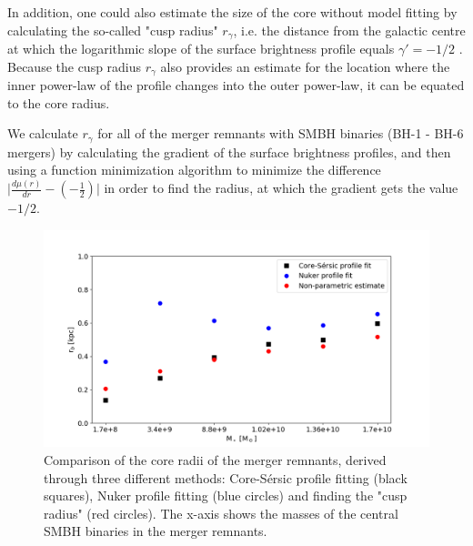 \documentclass[english, oneside]{HYgradu}
\begin{document}
In addition, one could also estimate the size of the core without model fitting by calculating the so-called "cusp radius" $r_\gamma$, i.e. the distance from the galactic centre at which the logarithmic slope of the surface brightness profile equals $\gamma' = -1/2$ \citep{Carollo1997, Lauer2007Cusp}. Because the cusp radius $r_\gamma$ also provides an estimate for the location where the inner power-law of the profile changes into the outer power-law, it can be equated to the core radius. 

We calculate $r_\gamma$ for all of the merger remnants with SMBH binaries (BH-1 - BH-6 mergers) by calculating the gradient of the surface brightness profiles, and then using a function minimization algorithm \citep{NelderMead} to minimize the difference $\big| \frac{d\mu(r)}{dr} - \left( - \frac{1}{2} \right) \big|$ in order to find the radius, at which the gradient gets the value $-1/2$. 

\begin{figure}[h]
	\centering
	\includegraphics[width=\textwidth]{rb_mass_relation.png}
	\caption{Comparison of the core radii of the merger remnants, derived through three different methods: Core-Sérsic profile fitting (black squares), Nuker profile fitting (blue circles) and  finding the "cusp radius" (red circles). The x-axis shows the masses of the central SMBH binaries in the merger remnants.}
	\label{figure:radii_comparison}
\end{figure}
\end{document}
